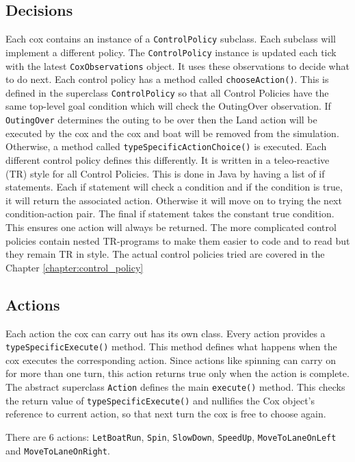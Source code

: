 \subsection{Decisions}
  Each cox contains an instance of a \texttt{ControlPolicy} subclass. Each subclass will implement a different policy. The \texttt{ControlPolicy} instance is updated each tick with the latest \texttt{CoxObservations} object. It uses these observations to decide what to do next.  Each control policy has a method called \texttt{chooseAction()}. This is defined in the superclass \texttt{ControlPolicy} so that all Control Policies have the same top-level goal condition which will check the OutingOver observation. If \texttt{OutingOver} determines the outing to be over then the Land action will be executed by the cox and the cox and boat will be removed from the simulation. Otherwise, a method called \texttt{typeSpecificActionChoice()} is executed. Each different control policy defines this differently. It is written in a teleo-reactive (TR) style for all Control Policies. This is done in Java by having a list of if statements. Each if statement will check a condition and if the condition is true, it will return the associated action. Otherwise it will move on to trying the next condition-action pair. The final if statement takes the constant true condition. This ensures one action will always be returned. The more complicated control policies contain nested TR-programs to make them easier to code and to read but they remain TR in style. The actual control policies tried are covered in the Chapter \ref{chapter:control_policy}
  
\subsection{Actions}
  Each action the cox can carry out has its own class. Every action provides a \texttt{typeSpecificExecute()} method. This method defines what happens when the cox executes the corresponding action. Since actions like spinning can carry on for more than one turn, this action returns true only when the action is complete. The abstract superclass \texttt{Action} defines the main \texttt{execute()} method. This checks the return value of \texttt{typeSpecificExecute()} and nullifies the Cox object's reference to current action, so that next turn the cox is free to choose again.

  There are 6 actions: \texttt{LetBoatRun}, \texttt{Spin}, \texttt{SlowDown}, \texttt{SpeedUp}, \texttt{MoveToLaneOnLeft} and \texttt{MoveToLaneOnRight}.
  
